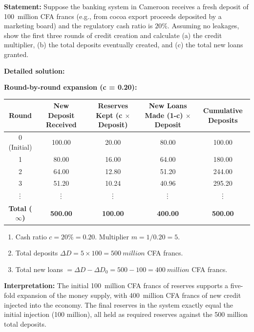 \documentclass[11pt]{article}
\def\vdots{\mathord{\vbox{\baselineskip3.2pt\lineskiplimit0pt\kern4pt\hbox{.}\hbox{.}\hbox{.}}}}%
\begin{document}
\begin{exoresolu}
\textbf{Statement:} Suppose the banking system in Cameroon receives a fresh deposit of \SI{100}{million} CFA francs (e.g., from cocoa export proceeds deposited by a marketing board) and the regulatory cash ratio is $20\%$. Assuming no leakages, show the first three rounds of credit creation and calculate (a) the credit multiplier, (b) the total deposits eventually created, and (c) the total new loans granted.

\tcblower
\textbf{Detailed solution:}

\textbf{Round-by-round expansion (c = 0.20):}

\begin{center}
\begin{tabular}{|c|c|c|c|c|}
\hline
\textbf{Round} & \textbf{New Deposit Received} & \textbf{Reserves Kept (c $\times$ Deposit)} & \textbf{New Loans Made (1-c) $\times$ Deposit} & \textbf{Cumulative Deposits} \\
\hline
0 (Initial) & 100.00 & 20.00 & 80.00 & 100.00 \\
1 & 80.00 & 16.00 & 64.00 & 180.00 \\
2 & 64.00 & 12.80 & 51.20 & 244.00 \\
3 & 51.20 & 10.24 & 40.96 & 295.20 \\
$\vdots$ & $\vdots$ & $\vdots$ & $\vdots$ & $\vdots$ \\
\hline
\textbf{Total ($\infty$)} & \textbf{500.00} & \textbf{100.00} & \textbf{400.00} & \textbf{500.00} \\
\hline
\end{tabular}
\end{center}

\begin{enumerate}
\item Cash ratio $c = 20\% = 0.20$. Multiplier $m = 1/0.20 = 5$.
\item Total deposits $\Delta D = 5 \times 100 = \SI{500}{million}$ CFA francs.
\item Total new loans $= \Delta D - \Delta D_0 = 500 - 100 = \SI{400}{million}$ CFA francs.
\end{enumerate}

\textbf{Interpretation:} The initial \SI{100}{million} CFA francs of reserves supports a five-fold expansion of the money supply, with \SI{400}{million} CFA francs of new credit injected into the economy. The final reserves in the system exactly equal the initial injection (100 million), all held as required reserves against the 500 million total deposits.
\end{exoresolu}
\end{document}
